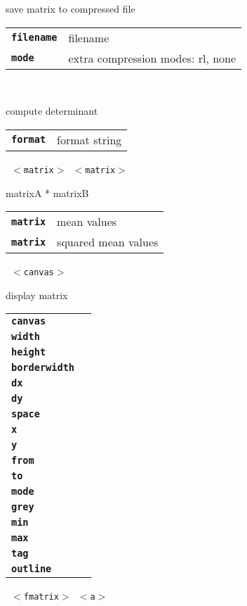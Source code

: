 \begin{description}
\begin{description}
        save matrix to compressed file

      \begin{tabular}{ll}
 \texttt{\textbf{filename}} &  filename  \\
 \texttt{\textbf{mode}} &       extra compression modes: rl, none  \\
      \end{tabular}
       \texttt{ } \

        compute determinant

      \begin{tabular}{ll}
 \texttt{\textbf{format}} &  format string  \\
      \end{tabular}
       \texttt{ $<$matrix$>$ $<$matrix$>$} \

        matrixA * matrixB

      \begin{tabular}{ll}
 \texttt{\textbf{matrix}} &  mean values \\
 \texttt{\textbf{matrix}} &  squared mean values \\
      \end{tabular}
       \texttt{ $<$canvas$>$                } \

        display matrix

      \begin{tabular}{ll}
 \texttt{\textbf{canvas}} &  \\
 \texttt{\textbf{width}} &          \\
 \texttt{\textbf{height}} &         \\
 \texttt{\textbf{borderwidth}} &    \\
 \texttt{\textbf{dx}} &             \\
 \texttt{\textbf{dy}} &             \\
 \texttt{\textbf{space}} &          \\
 \texttt{\textbf{x}} &              \\
 \texttt{\textbf{y}} &              \\
 \texttt{\textbf{from}} &           \\
 \texttt{\textbf{to}} &             \\
 \texttt{\textbf{mode}} &           \\
 \texttt{\textbf{grey}} &           \\
 \texttt{\textbf{min}} &            \\
 \texttt{\textbf{max}} &            \\
 \texttt{\textbf{tag}} &            \\
 \texttt{\textbf{outline}} &        \\
      \end{tabular}
       \texttt{ $<$fmatrix$>$ $<$a$>$} \


\end{description}
\end{description}
